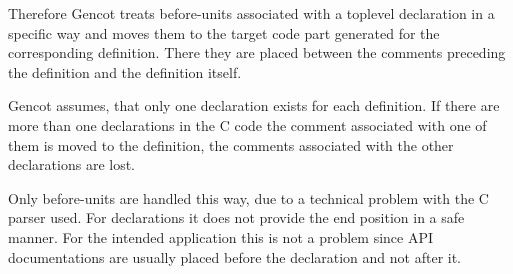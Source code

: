 Therefore Gencot treats before-units associated with a toplevel declaration in a specific way and 
moves them to the target code part generated for the corresponding definition. There they are placed between
the comments preceding the definition and the definition itself. 

Gencot assumes, that only one declaration exists for each definition. If there are more than one declarations 
in the C code the comment associated with one of them is moved to the definition, the comments associated with
the other declarations are lost. 

Only before-units are handled this way, due to a technical problem with the C parser used. For declarations it does not provide 
the end position in a safe manner. For the intended application this is not a problem since API documentations are
usually placed before the declaration and not after it.
